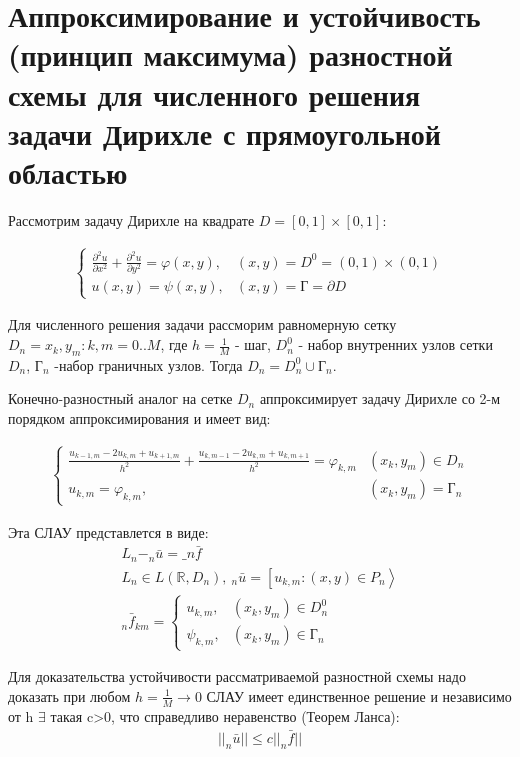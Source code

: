 \documentclass[__main__.tex]{subfiles}
\begin{document}
\section{Аппроксимирование и устойчивость (принцип максимума) разностной схемы для численного решения задачи Дирихле с прямоугольной областью}


Рассмотрим задачу Дирихле на квадрате $D=[0,1] \times[0,1]$:

\begin{gather}
	\begin{cases}
		\frac{\partial^2 u}{\partial x^2}+\frac{\partial^2 u}{\partial y^2}=\varphi(x,y),  & (x,y)=D^0=(0,1)\times(0,1)\\
		u(x,y)=\psi (x,y), & (x,y)=\text{Г}=\partial D
	\end{cases}
\end{gather}


Для численного решения задачи рассморим равномерную сетку $D_n ={x_k,y_m}:k,m=0..M$, где $h=\frac{1}{M} $ - шаг, $D_n ^0$ - набор внутренних узлов сетки $D_n$, $\text{Г}_n$ -набор граничных узлов. Тогда $D_{n} = D_n^0 \cup \text{Г}_n$.

Конечно-разностный аналог на сетке $D_n$ аппроксимирует задачу Дирихле со 2-м порядком аппроксимирования и имеет вид:

\begin{gather}
	\begin{cases}
	\frac{u_{k-1,m}-2u_{k,m}+u_{k+1,m}}{h^2}+\frac{u_{k,m-1}-2u_{k,m}+u_{k,m+1}}{h^2}=\varphi _{k,m} & (x_k,y_m)\in D_n \\
		u_{k,m}=\varphi _{k,m}, & (x_k,y_m)=\text{Г}_n
	\end{cases}
	\end{gather}


Эта СЛАУ представлется в виде:
\begin{gather}
	L_n- _n\bar{u}= \_n\bar{f}\\
	L_{n}\in L(\mathbb{R},D_n),\ _n\bar{u}=\left[u_{k,m}:(x,y)\in P_n\right>\\
	_n\bar{f}_{km}=\begin{cases}
		u_{k,m}, & (x_k,y_m)\in D_n^0\\
		\psi_{k,m}, & (x_k,y_m)\in \text{Г}_n
		\end{cases}
\end{gather}

Для доказательства устойчивости рассматриваемой разностной схемы  надо доказать  при любом $h=\frac{1}{M}\to 0$ СЛАУ имеет единственное решение и независимо от h $\exists$ такая c>0, что справедливо неравенство (Теорем Ланса):
\begin{gather}
	||_n\bar{u}|| \leq c||_n\bar{f}||
\end{gather}
\end{document}
